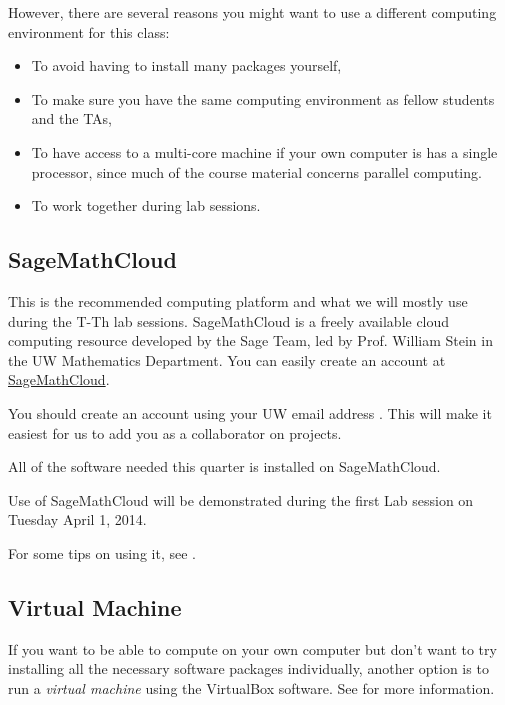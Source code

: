 \documentclass[letterpaper,10pt,english]{sphinxmanual}
\begin{document}
However, there are several reasons you might want to use a different
computing environment for this class:
\begin{itemize}
\item {} 
To avoid having to install many packages yourself,

\item {} 
To make sure you have the same computing environment as fellow students
and the TAs,

\item {} 
To have access to a multi-core machine if your own computer is has a
single processor, since much of the course material concerns parallel computing.

\item {} 
To work together during lab sessions.

\end{itemize}


\subsection{SageMathCloud}
\label{computing_options:options-smc}\label{computing_options:sagemathcloud}
This is the recommended computing platform  and what we will mostly use
during the T-Th lab sessions.  SageMathCloud is a freely
available cloud computing resource developed by the Sage Team, led by
Prof. William Stein in the UW Mathematics Department.  You can easily create
an account at \href{https://cloud.sagemath.com/}{SageMathCloud}.

You should create an account using your UW email address .
This will make it easiest for us to add you as a collaborator on projects.

All of the software needed this quarter is installed on SageMathCloud.

Use of SageMathCloud will be demonstrated during the first Lab session on
Tuesday April 1, 2014.

For some tips on using it, see .


\subsection{Virtual Machine}
\label{computing_options:options-vm}\label{computing_options:virtual-machine}
If you want to be able to compute on your own computer but don't want to
try installing all the necessary software packages
individually, another option is to
run a \emph{virtual machine} using the VirtualBox software.  See {\hyperref[vm:vm]{}}
for more information.
\end{document}
